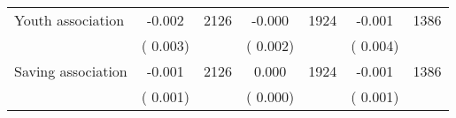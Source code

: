 \begin{tabular}{l*{6}{c}}
Youth association        &             -0.002      &       2126       &             -0.000      &       1924       &             -0.001      &       1386       \\
                       &       (       0.003)            &                               &       (       0.002)            &                               &       (       0.004)            &                               \\
Saving association        &             -0.001      &       2126       &              0.000      &       1924       &             -0.001      &       1386       \\
                       &       (       0.001)            &                               &       (       0.000)            &                               &       (       0.001)            &                               \\
\hline \end{tabular}